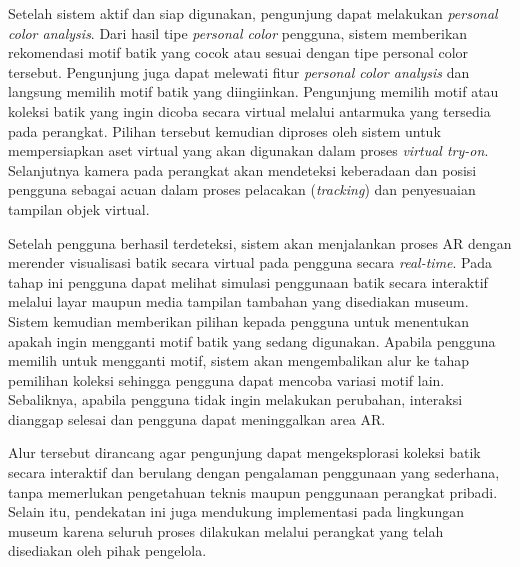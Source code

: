 Setelah sistem aktif dan siap digunakan, pengunjung dapat melakukan \textit{personal color analysis}. Dari hasil tipe \textit{personal color} pengguna, sistem memberikan rekomendasi motif batik yang cocok atau sesuai dengan tipe personal color tersebut. Pengunjung juga dapat melewati fitur \textit{personal color analysis} dan langsung memilih motif batik yang diingiinkan. Pengunjung memilih motif atau koleksi batik yang ingin dicoba secara virtual melalui antarmuka yang tersedia pada perangkat. Pilihan tersebut kemudian diproses oleh sistem untuk mempersiapkan aset virtual yang akan digunakan dalam proses \textit{virtual try-on}. Selanjutnya kamera pada perangkat akan mendeteksi keberadaan dan posisi pengguna sebagai acuan dalam proses pelacakan (\textit{tracking}) dan penyesuaian tampilan objek virtual.

Setelah pengguna berhasil terdeteksi, sistem akan menjalankan proses AR dengan merender visualisasi batik secara virtual pada pengguna secara \textit{real-time}. Pada tahap ini pengguna dapat melihat simulasi penggunaan batik secara interaktif melalui layar maupun media tampilan tambahan yang disediakan museum. Sistem kemudian memberikan pilihan kepada pengguna untuk menentukan apakah ingin mengganti motif batik yang sedang digunakan. Apabila pengguna memilih untuk mengganti motif, sistem akan mengembalikan alur ke tahap pemilihan koleksi sehingga pengguna dapat mencoba variasi motif lain. Sebaliknya, apabila pengguna tidak ingin melakukan perubahan, interaksi dianggap selesai dan pengguna dapat meninggalkan area AR.

Alur tersebut dirancang agar pengunjung dapat mengeksplorasi koleksi batik secara interaktif dan berulang dengan pengalaman penggunaan yang sederhana, tanpa memerlukan pengetahuan teknis maupun penggunaan perangkat pribadi. Selain itu, pendekatan ini juga mendukung implementasi pada lingkungan museum karena seluruh proses dilakukan melalui perangkat yang telah disediakan oleh pihak pengelola.



